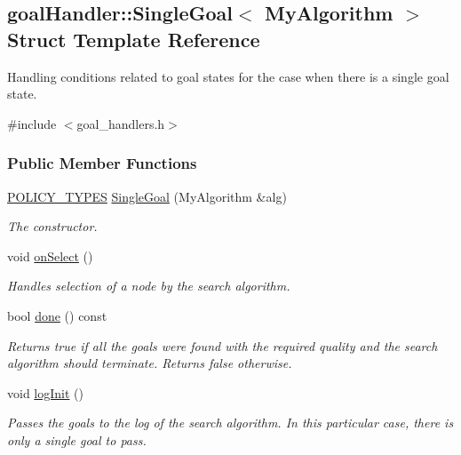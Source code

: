 \hypertarget{structgoalHandler_1_1SingleGoal}{}\subsection{goal\+Handler\+:\+:Single\+Goal$<$ My\+Algorithm $>$ Struct Template Reference}
\label{structgoalHandler_1_1SingleGoal}


Handling conditions related to goal states for the case when there is a single goal state.  




{\ttfamily \#include $<$goal\+\_\+handlers.\+h$>$}

\subsubsection*{Public Member Functions}
\begin{DoxyCompactItemize}
\item 
\hyperlink{extensions_2shared__policies_2headers_8h_ae70a06fa4631780beea14971eb36a562}{P\+O\+L\+I\+C\+Y\+\_\+\+T\+Y\+P\+ES} \hyperlink{structgoalHandler_1_1SingleGoal_af2f57b40ce9f90e1a7ce6d8050f7c7d9}{Single\+Goal} (My\+Algorithm \&alg)
\begin{DoxyCompactList}\small\item\em The constructor. \end{DoxyCompactList}\item 
void \hyperlink{structgoalHandler_1_1SingleGoal_ae4c18dafb6ef898db94cf18d2d2e0c54}{on\+Select} ()\hypertarget{structgoalHandler_1_1SingleGoal_ae4c18dafb6ef898db94cf18d2d2e0c54}{}\label{structgoalHandler_1_1SingleGoal_ae4c18dafb6ef898db94cf18d2d2e0c54}

\begin{DoxyCompactList}\small\item\em Handles selection of a node by the search algorithm. \end{DoxyCompactList}\item 
bool \hyperlink{structgoalHandler_1_1SingleGoal_af67e7e0ab430afb4981904987ba13679}{done} () const 
\begin{DoxyCompactList}\small\item\em Returns {\ttfamily true} if all the goals were found with the required quality and the search algorithm should terminate. Returns {\ttfamily false} otherwise. \end{DoxyCompactList}\item 
void \hyperlink{structgoalHandler_1_1SingleGoal_afc55ca98c847ffcab797d3ca0f070a16}{log\+Init} ()\hypertarget{structgoalHandler_1_1SingleGoal_afc55ca98c847ffcab797d3ca0f070a16}{}\label{structgoalHandler_1_1SingleGoal_afc55ca98c847ffcab797d3ca0f070a16}

\begin{DoxyCompactList}\small\item\em Passes the goals to the log of the search algorithm. In this particular case, there is only a single goal to pass. \end{DoxyCompactList}\end{DoxyCompactItemize}

